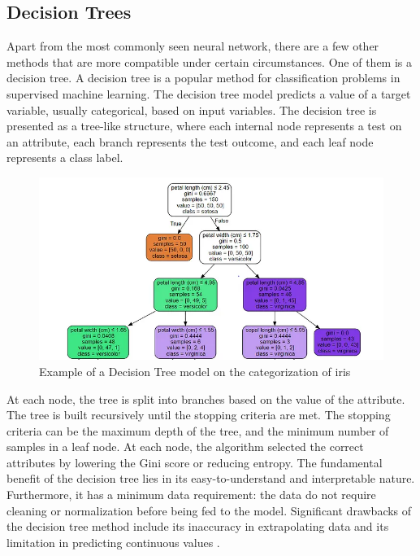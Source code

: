 \documentclass[aps,prb,twocolumn,superscriptaddress,floatfix]{revtex4-2}
\begin{document}
\subsection{Decision Trees}
Apart from the most commonly seen neural network, there are a few other methods that are more compatible under certain circumstances. One of them is a decision tree.
A decision tree is a popular method for classification problems in supervised machine learning. The decision tree model predicts a value of a target variable, usually categorical, based on input variables.
\cite{Rokach2014DataMW}
The decision tree is presented as a tree-like structure, where each internal node represents a test on an attribute, each branch represents the test outcome, and each leaf node represents a class label.
\begin{figure}[h]
    \includegraphics[clip=true,width=\columnwidth]{DT.png}
    \caption{Example of a Decision Tree model on the categorization of iris}
\end{figure}
At each node, the tree is split into branches based on the value of the attribute. The tree is built recursively until the stopping criteria are met. The stopping criteria can be the maximum depth of the tree, and the minimum number of samples in a leaf node.
At each node, the algorithm selected the correct attributes by lowering the Gini score or reducing entropy.
\cite{shalev2014understanding}
The fundamental benefit of the decision tree lies in its easy-to-understand and interpretable nature. Furthermore, it has a minimum data requirement: the data do not require cleaning or normalization before being fed to the model.\cite{quinlan1986induction}
Significant drawbacks of the decision tree method include its inaccuracy in extrapolating data and its limitation in predicting continuous values\cite{ibmWhatDecision}
\cite{scikitlearn110Decision}.
\end{document}
